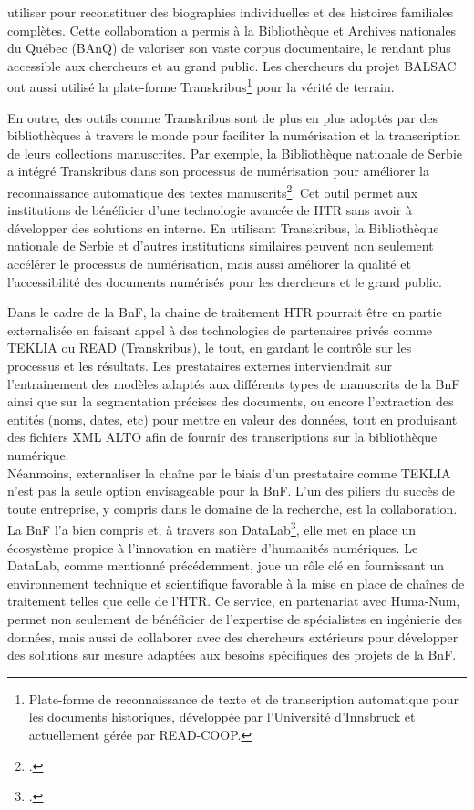 \documentclass[a4paper,12pt,twoside]{book}
\begin{document}
utiliser pour reconstituer des biographies individuelles et des histoires familiales complètes. Cette collaboration a permis à la Bibliothèque et Archives nationales du Québec (BAnQ) de valoriser son vaste corpus documentaire, le rendant plus accessible aux chercheurs et au grand public. Les chercheurs du projet BALSAC ont aussi utilisé la plate-forme Transkribus\footnote{ Plate-forme de reconnaissance de texte et de transcription automatique pour les documents historiques, développée par l'Université d'Innsbruck et actuellement gérée par READ-COOP.} pour la vérité de terrain. 
	
	En outre, des outils comme Transkribus sont de plus en plus adoptés par des bibliothèques à travers le monde pour faciliter la numérisation et la transcription de leurs collections manuscrites. Par exemple, la Bibliothèque nationale de Serbie a intégré Transkribus dans son processus de numérisation pour améliorer la reconnaissance automatique des textes manuscrits\footcite{malesev_need_2022}. Cet outil permet aux institutions de bénéficier d’une technologie avancée de HTR sans avoir à développer des solutions en interne. En utilisant Transkribus, la Bibliothèque nationale de Serbie et d’autres institutions similaires peuvent non seulement accélérer le processus de numérisation, mais aussi améliorer la qualité et l’accessibilité des documents numérisés pour les chercheurs et le grand public.
	
	Dans le cadre de la BnF, la chaine de traitement HTR pourrait être en partie externalisée en faisant appel à des technologies de partenaires privés comme TEKLIA ou READ (Transkribus), le tout, en gardant le contrôle sur les processus et les résultats. Les prestataires externes interviendrait sur l’entrainement des modèles adaptés aux différents types de manuscrits de la BnF ainsi que sur la segmentation précises des documents, ou encore l’extraction des entités (noms, dates, etc) pour mettre en valeur des données, tout en produisant des fichiers XML ALTO afin de fournir des transcriptions sur la bibliothèque numérique.
	\\
	
	Néanmoins, externaliser la chaîne par le biais d’un prestataire comme TEKLIA n’est pas la seule option envisageable pour la BnF. L’un des piliers du succès de toute entreprise, y compris dans le domaine de la recherche, est la collaboration. La BnF l’a bien compris et, à travers son DataLab\footcite{carlin_bnf_2021}, elle met en place un écosystème propice à l’innovation en matière d’humanités numériques. Le DataLab, comme mentionné précédemment, joue un rôle clé en fournissant un environnement technique et scientifique favorable à la mise en place de chaînes de traitement telles que celle de l’HTR. Ce service, en partenariat avec Huma-Num, permet non seulement de bénéficier de l’expertise de spécialistes en ingénierie des données, mais aussi de collaborer avec des chercheurs extérieurs pour développer des solutions sur mesure adaptées aux besoins spécifiques des projets de la BnF.
	\\
	
\end{document}
